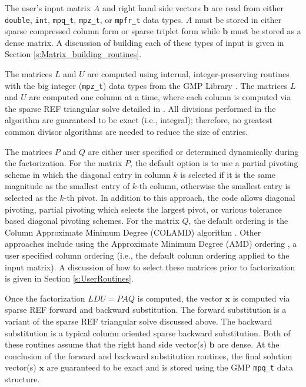 \documentclass[12pt]{article}
\theoremstyle{definition}
\begin{document}
The user's input matrix $A$ and right hand side vectors $\mathbf{b}$ are read
from either \verb|double|, \verb|int|, \verb|mpq_t|, \verb|mpz_t|, or
\verb|mpfr_t| data types. $A$ must be stored in either sparse compressed column
form or sparse triplet form while $\mathbf{b}$ must be stored as a dense
matrix. A discussion of building each of these types of input is given in
Section \ref{s:Matrix_building_routines}.

The matrices $L$ and $U$ are computed using internal, integer-preserving routines with the big integer (\verb|mpz_t|) data types from the GMP Library \cite{granlund2015gnu}. The matrices $L$ and $U$ are computed one column at a time, where each column is computed via the sparse REF triangular solve detailed in \cite{lourenco2019exact}. All divisions performed in the algorithm are guaranteed to be exact (i.e., integral); therefore, no greatest common divisor algorithms are needed to reduce the size of entries.

The matrices $P$ and $Q$ are either user specified or determined dynamically
during the factorization. For the matrix $P$, the default option is to use a
partial pivoting scheme in which the diagonal entry in column $k$ is selected
if it is the same magnitude as the smallest entry of $k$-th column, otherwise
the smallest entry is selected as the $k$-th pivot. In addition to this
approach, the code allows diagonal pivoting, partial pivoting which selects the
largest pivot, or various tolerance based diagonal pivoting schemes. For the
matrix $Q$, the default ordering is the Column Approximate Minimum Degree
(COLAMD) algorithm \cite{davis2004algorithmcolamd,davis2004column}. Other
approaches include using the Approximate Minimum Degree (AMD) ordering
\cite{amestoy1996approximate,amestoy2004algorithmamd}, a user specified column
ordering (i.e., the default column ordering applied to the input matrix). A
discussion of how to select these matrices prior to factorization is given in
Section \ref{s:UserRoutines}.

Once the factorization $L D U = P A Q $ is computed, the vector $\mathbf{x}$ is
computed via sparse REF forward and backward substitution. The forward
substitution is a variant of the sparse REF triangular solve discussed above.
The backward substitution is a typical column oriented sparse backward
substitution. Both of these routines assume that the right hand side vector(s)
$\mathbf{b}$ are dense. At the conclusion of the forward and backward
substitution routines, the final solution vector(s) $\mathbf{x}$ are guaranteed
to be exact and is stored using the GMP \verb|mpq_t| data structure.
\end{document}
